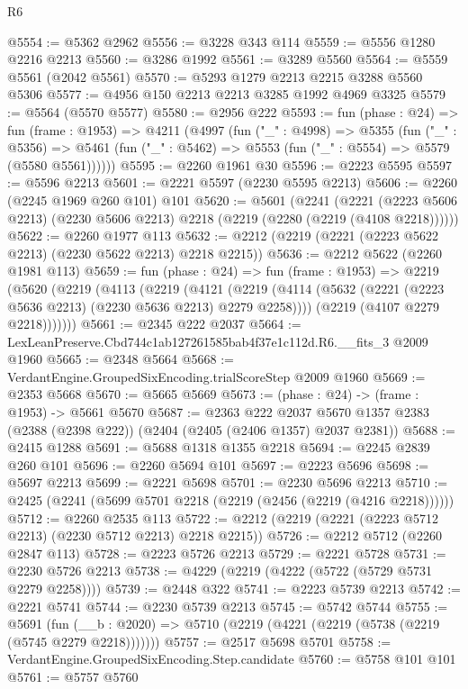 \begin{lexlean}{R6}
\begin{coremodule}
@5554 := @5362 @2962
@5556 := @3228 @343 @114
@5559 := @5556 @1280 @2216 @2213
@5560 := @3286 @1992
@5561 := @3289 @5560
@5564 := @5559 @5561 (@2042 @5561)
@5570 := @5293 @1279 @2213 @2215 @3288 @5560 @5306
@5577 := @4956 @150 @2213 @2213 @3285 @1992 @4969 @3325
@5579 := @5564 (@5570 @5577)
@5580 := @2956 @222
@5593 := fun (phase : @24) =>
  fun (frame : @1953) =>
  @4211
    (@4997
      (fun ("_" : @4998) =>
      @5355
        (fun ("_" : @5356) =>
        @5461 (fun ("_" : @5462) => @5553 (fun ("_" : @5554) => @5579 (@5580 @5561))))))
@5595 := @2260 @1961 @30
@5596 := @2223 @5595
@5597 := @5596 @2213
@5601 := @2221 @5597 (@2230 @5595 @2213)
@5606 := @2260 (@2245 @1969 @260 @101) @101
@5620 := @5601
    (@2241
      (@2221 (@2223 @5606 @2213) (@2230 @5606 @2213) @2218 (@2219 (@2280 (@2219 (@4108 @2218))))))
@5622 := @2260 @1977 @113
@5632 := @2212 (@2219 (@2221 (@2223 @5622 @2213) (@2230 @5622 @2213) @2218 @2215))
@5636 := @2212 @5622 (@2260 @1981 @113)
@5659 := fun (phase : @24) =>
  fun (frame : @1953) =>
  @2219
    (@5620
      (@2219
        (@4113
          (@2219
            (@4121
              (@2219 (@4114 (@5632 (@2221 (@2223 @5636 @2213) (@2230 @5636 @2213) @2279 @2258))))
              (@2219 (@4107 @2279 @2218)))))))
@5661 := @2345 @222 @2037
@5664 := LexLeanPreserve.Cbd744c1ab127261585bab4f37e1c112d.R6.__fits_3 @2009 @1960
@5665 := @2348 @5664
@5668 := VerdantEngine.GroupedSixEncoding.trialScoreStep @2009 @1960
@5669 := @2353 @5668
@5670 := @5665 @5669
@5673 := (phase : @24) -> (frame : @1953) -> @5661 @5670
@5687 := @2363
    @222
    @2037
    @5670
    @1357
    @2383
    (@2388 (@2398 @222))
    (@2404 (@2405 (@2406 @1357) @2037 @2381))
@5688 := @2415 @1288
@5691 := @5688 @1318 @1355 @2218
@5694 := @2245 @2839 @260 @101
@5696 := @2260 @5694 @101
@5697 := @2223 @5696
@5698 := @5697 @2213
@5699 := @2221 @5698
@5701 := @2230 @5696 @2213
@5710 := @2425 (@2241 (@5699 @5701 @2218 (@2219 (@2456 (@2219 (@4216 @2218))))))
@5712 := @2260 @2535 @113
@5722 := @2212 (@2219 (@2221 (@2223 @5712 @2213) (@2230 @5712 @2213) @2218 @2215))
@5726 := @2212 @5712 (@2260 @2847 @113)
@5728 := @2223 @5726 @2213
@5729 := @2221 @5728
@5731 := @2230 @5726 @2213
@5738 := @4229 (@2219 (@4222 (@5722 (@5729 @5731 @2279 @2258))))
@5739 := @2448 @322
@5741 := @2223 @5739 @2213
@5742 := @2221 @5741
@5744 := @2230 @5739 @2213
@5745 := @5742 @5744
@5755 := @5691
    (fun (__b : @2020) => @5710 (@2219 (@4221 (@2219 (@5738 (@2219 (@5745 @2279 @2218)))))))
@5757 := @2517 @5698 @5701
@5758 := VerdantEngine.GroupedSixEncoding.Step.candidate
@5760 := @5758 @101 @101
@5761 := @5757 @5760

\end{coremodule}
\end{lexlean}
